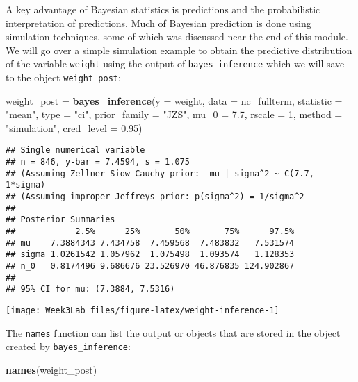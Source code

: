 \documentclass[]{article}
\newenvironment{Shaded}{\begin{snugshade}}{\end{snugshade}}
\newcommand{\KeywordTok}[1]{\textcolor[rgb]{0.13,0.29,0.53}{\textbf{#1}}}
\newcommand{\DataTypeTok}[1]{\textcolor[rgb]{0.13,0.29,0.53}{#1}}
\newcommand{\DecValTok}[1]{\textcolor[rgb]{0.00,0.00,0.81}{#1}}
\newcommand{\FloatTok}[1]{\textcolor[rgb]{0.00,0.00,0.81}{#1}}
\newcommand{\StringTok}[1]{\textcolor[rgb]{0.31,0.60,0.02}{#1}}
\newcommand{\NormalTok}[1]{#1}
\begin{document}
A key advantage of Bayesian statistics is predictions and the
probabilistic interpretation of predictions. Much of Bayesian prediction
is done using simulation techniques, some of which was discussed near
the end of this module. We will go over a simple simulation example to
obtain the predictive distribution of the variable \texttt{weight} using
the output of \texttt{bayes\_inference} which we will save to the object
\texttt{weight\_post}:

\begin{Shaded}
\begin{Highlighting}[]
\NormalTok{weight_post =}\StringTok{ }\KeywordTok{bayes_inference}\NormalTok{(}\DataTypeTok{y =}\NormalTok{ weight, }\DataTypeTok{data =}\NormalTok{ nc_fullterm, }
                              \DataTypeTok{statistic =} \StringTok{"mean"}\NormalTok{, }\DataTypeTok{type =} \StringTok{"ci"}\NormalTok{,  }
                              \DataTypeTok{prior_family =} \StringTok{"JZS"}\NormalTok{, }\DataTypeTok{mu_0 =} \FloatTok{7.7}\NormalTok{, }\DataTypeTok{rscale =} \DecValTok{1}\NormalTok{,}
                              \DataTypeTok{method =} \StringTok{"simulation"}\NormalTok{,}
                              \DataTypeTok{cred_level =} \FloatTok{0.95}\NormalTok{)}
\end{Highlighting}
\end{Shaded}

\begin{verbatim}
## Single numerical variable
## n = 846, y-bar = 7.4594, s = 1.075
## (Assuming Zellner-Siow Cauchy prior:  mu | sigma^2 ~ C(7.7, 1*sigma)
## (Assuming improper Jeffreys prior: p(sigma^2) = 1/sigma^2
## 
## Posterior Summaries
##            2.5%      25%       50%       75%      97.5%
## mu    7.3884343 7.434758  7.459568  7.483832   7.531574
## sigma 1.0261542 1.057962  1.075498  1.093574   1.128353
## n_0   0.8174496 9.686676 23.526970 46.876835 124.902867
## 
## 95% CI for mu: (7.3884, 7.5316)
\end{verbatim}

\begin{center}\texttt{[image: Week3Lab\_files/figure-latex/weight-inference-1]} \end{center}

The \texttt{names} function can list the output or objects that are
stored in the object created by \texttt{bayes\_inference}:

\begin{Shaded}
\begin{Highlighting}[]
\KeywordTok{names}\NormalTok{(weight_post)}
\end{Highlighting}
\end{Shaded}
\end{document}
